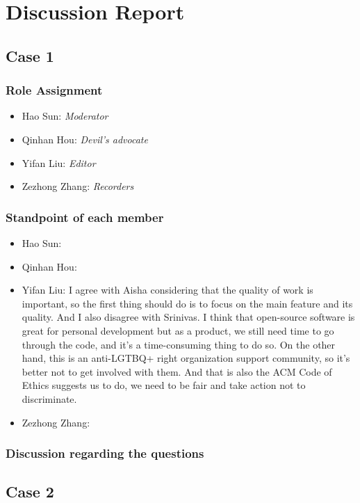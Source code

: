 \newpage
\section{Discussion Report}
	\subsection{Case 1}
		\subsubsection{Role Assignment}
		\begin{itemize}
  			\item Hao Sun: \emph{Moderator}
  			\item Qinhan Hou: \emph{Devil’s advocate}
  			\item Yifan Liu: \emph{Editor} 
  			\item Zezhong Zhang: \emph{Recorders}
		\end{itemize}
		\subsubsection{Standpoint of each member}
		\begin{itemize}
  			\item Hao Sun: 
  			\item Qinhan Hou:
  			\item Yifan Liu: I agree with Aisha considering that the quality of work is important, so the first thing should do is to focus on the main feature and its quality. And I also disagree with Srinivas. I think that open-source software is great for personal development but as a product, we still need time to go through the code, and it's a time-consuming thing to do so. On the other hand, this is an anti-LGTBQ+ right organization support community, so it's better not to get involved with them. 
  			And that is also the ACM Code of Ethics suggests us to do, we need to be fair and take action not to discriminate.
  			\item Zezhong Zhang:
		\end{itemize}
		\subsubsection{Discussion regarding the questions}

	\subsection{Case 2}
